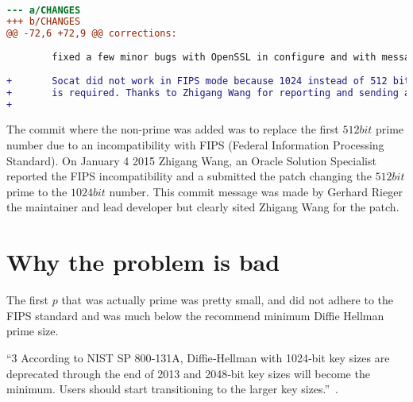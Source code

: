 \documentclass[letterpaper,11pt,notitlepage,fleqn]{article}
\begin{document}
\\
\begin{lstlisting}[language=diff]
--- a/CHANGES
+++ b/CHANGES
@@ -72,6 +72,9 @@ corrections:
 
        fixed a few minor bugs with OpenSSL in configure and with messages
 
+       Socat did not work in FIPS mode because 1024 instead of 512 bit DH prime
+       is required. Thanks to Zhigang Wang for reporting and sending a patch.
+
\end{lstlisting}
The commit where the non-prime was added was to replace the first $512 bit$ prime number due to an incompatibility with FIPS (Federal Information Processing Standard). On January 4 2015 Zhigang Wang, an Oracle Solution Specialist reported the FIPS incompatibility and a submitted the patch changing the $512 bit$ prime to the $1024 bit$ number. This commit message was made by Gerhard Rieger the maintainer and lead developer but clearly sited Zhigang Wang for the patch.
\section{Why the problem is bad}
\indent The first $p$ that was actually prime was pretty small, and did not adhere to the FIPS standard and was much below the recommend minimum Diffie Hellman prime size.

“3 According to NIST SP 800‐131A, Diffie‐Hellman with 1024‐bit key sizes are deprecated through the end of 2013 and 2048‐bit key sizes will become the minimum. Users should start transitioning to the larger key sizes.”~\cite{FIPS}. 
\end{document}
